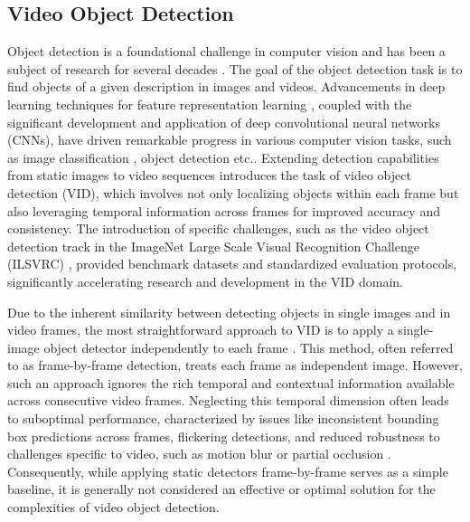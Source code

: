 \subsection{Video Object Detection} \label{Background:VideoObjectDetection}


Object detection is a foundational challenge in computer vision and has been a subject of research for several decades \cite{fischlerRepresentationMatchingPictorial1973}. The goal of the object detection task is to find objects of a given description in images and videos.
Advancements in deep learning techniques for feature representation learning \cite{hintonReducingDimensionalityData2006, lecunDeepLearning2015}, coupled with the significant development and application of deep convolutional neural networks (CNNs), have driven remarkable progress in various computer vision tasks, such as image classification \cite{krizhevskyImageNetClassificationDeep2012}, object detection \cite{girshickRichFeatureHierarchies2014a} etc..
Extending detection capabilities from static images to video sequences introduces the task of video object detection (VID), which involves not only localizing objects within each frame but also leveraging temporal information across frames for improved accuracy and consistency.
The introduction of specific challenges, such as the video object detection track in the ImageNet Large Scale Visual Recognition Challenge (ILSVRC) \cite{russakovskyImageNetLargeScale2015}, provided benchmark datasets and standardized evaluation protocols, significantly accelerating research and development in the VID domain.

Due to the inherent similarity between detecting objects in single images and in video frames, the most straightforward approach to VID is to apply a single-image object detector independently to each frame \cite{redmonYouOnlyLook2016, redmonYOLO9000BetterFaster2016}. This method, often referred to as frame-by-frame detection, treats each frame as independent image. However, such an approach ignores the rich temporal and contextual information available across consecutive video frames. Neglecting this temporal dimension often leads to suboptimal performance, characterized by issues like inconsistent bounding box predictions across frames, flickering detections, and reduced robustness to challenges specific to video, such as motion blur or partial occlusion \cite{placeholder_vid_limitations_survey}. Consequently, while applying static detectors frame-by-frame serves as a simple baseline, it is generally not considered an effective or optimal solution for the complexities of video object detection.

